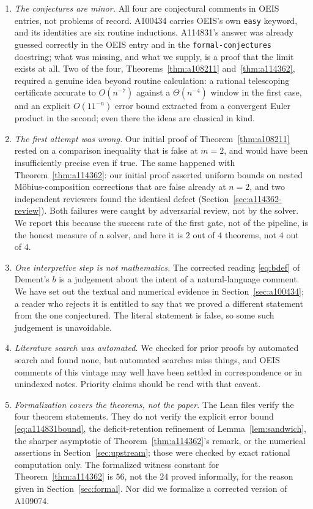 \documentclass[11pt]{article}
\theoremstyle{plain}
\theoremstyle{definition}
\theoremstyle{remark}
\numberwithin{equation}{section}
\begin{document}
\begin{enumerate}
\item \emph{The conjectures are minor.} All four are conjectural comments in OEIS entries, not
problems of record. A100434 carries OEIS's own \texttt{easy} keyword, and its identities are six
routine inductions. A114831's answer was already guessed correctly in the OEIS entry and in the
\texttt{formal-conjectures} docstring; what was missing, and what we supply, is a proof that the
limit exists at all. Two of the four, Theorems~\ref{thm:a108211} and~\ref{thm:a114362}, required
a genuine idea beyond routine calculation: a rational telescoping certificate accurate to
$O(n^{-7})$ against a $\Theta(n^{-4})$ window in the first case, and an explicit $O(11^{-n})$
error bound extracted from a convergent Euler product in the second; even there the ideas are
classical in kind.

\item \emph{The first attempt was wrong.} Our initial proof of Theorem~\ref{thm:a108211} rested
on a comparison inequality that is false at $m=2$, and would have been insufficiently precise
even if true. The same happened with Theorem~\ref{thm:a114362}: our initial proof asserted
uniform bounds on nested M\"obius-composition corrections that are false already at $n=2$, and
two independent reviewers found the identical defect (Section~\ref{sec:a114362-review}). Both
failures were caught by adversarial review, not by the solver. We report this because the success
rate of the first gate, not of the pipeline, is the honest measure of a solver, and here it is
$2$ out of $4$ theorems, not $4$ out of $4$.

\item \emph{One interpretive step is not mathematics.} The corrected reading \eqref{eq:bdef} of
Dement's $b$ is a judgement about the intent of a natural-language comment. We have set out the
textual and numerical evidence in Section~\ref{sec:a100434}; a reader who rejects it is entitled
to say that we proved a different statement from the one conjectured. The literal statement is
false, so some such judgement is unavoidable.

\item \emph{Literature search was automated.} We checked for prior proofs by automated search and
found none, but automated searches miss things, and OEIS comments of this vintage may well have
been settled in correspondence or in unindexed notes. Priority claims should be read with that
caveat.

\item \emph{Formalization covers the theorems, not the paper.} The Lean files verify the four
theorem statements. They do not verify the explicit error bound \eqref{eq:a114831bound}, the
deficit-retention refinement of Lemma~\ref{lem:sandwich}, the sharper asymptotic of
Theorem~\ref{thm:a114362}'s remark, or the numerical assertions in Section~\ref{sec:upstream};
those were checked by exact rational computation only. The formalized witness constant for
Theorem~\ref{thm:a114362} is $56$, not the $24$ proved informally, for the reason given in
Section~\ref{sec:formal}. Nor did we formalize a corrected version of A109074.


\end{enumerate}
\end{document}
